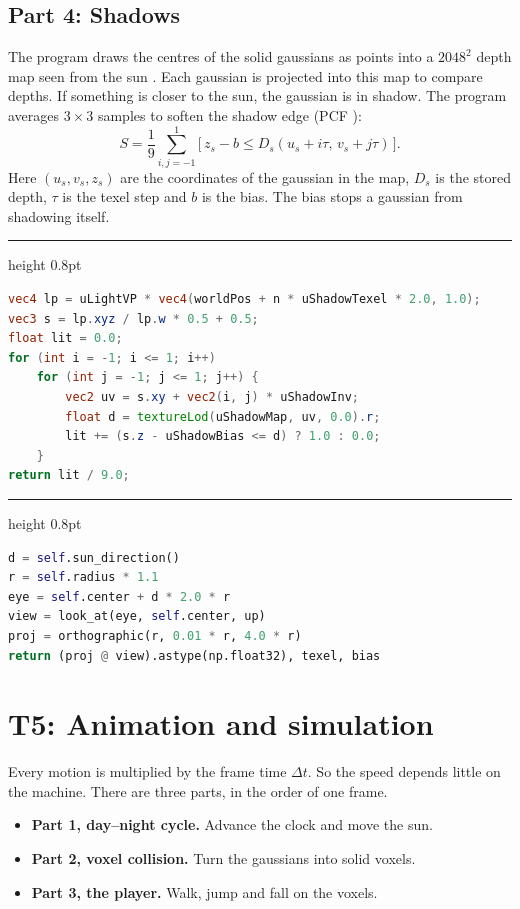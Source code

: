 \documentclass[9pt,twocolumn,a4paper]{extarticle}
\newenvironment{codebox}{\par\vspace{5pt}\noindent\begin{minipage}{\columnwidth}\hrule height 0.8pt\vspace{2pt}}{\end{minipage}\par\vspace{5pt}\noindent\ignorespaces}
\newcommand{\code}[1]{\texttt{#1}}
\begin{document}
\subsection{Part 4: Shadows}
The program draws the centres of the solid gaussians as points into a $2048^2$ depth map seen from the sun \cite{williams1978}. Each gaussian is projected into this map to compare depths. If something is closer to the sun, the gaussian is in shadow. The program averages $3\times3$ samples to soften the shadow edge (PCF \cite{reeves1987}):
\begin{equation}
S=\frac19\sum_{i,j=-1}^{1}\big[\,z_s-b\le D_s(u_s+i\tau,\,v_s+j\tau)\,\big].
\label{eq:pcf}
\end{equation}
Here $(u_s,v_s,z_s)$ are the coordinates of the gaussian in the map, $D_s$ is the stored depth, $\tau$ is the texel step and $b$ is the bias. The bias stops a gaussian from shadowing itself.

\begin{codebox}
\begin{lstlisting}[language=GLSL,caption={\code{render/shaders/splat\_prep.vert}, \code{shadowFactor}: $3\times3$ PCF},label={lst:pcf}]
vec4 lp = uLightVP * vec4(worldPos + n * uShadowTexel * 2.0, 1.0);
vec3 s = lp.xyz / lp.w * 0.5 + 0.5;
float lit = 0.0;
for (int i = -1; i <= 1; i++)
    for (int j = -1; j <= 1; j++) {
        vec2 uv = s.xy + vec2(i, j) * uShadowInv;
        float d = textureLod(uShadowMap, uv, 0.0).r;
        lit += (s.z - uShadowBias <= d) ? 1.0 : 0.0;
    }
return lit / 9.0;
\end{lstlisting}
\end{codebox}

\begin{codebox}
\begin{lstlisting}[language=Python,caption={\code{core/lighting.py}, \code{Lighting.shadow\_setup}: view matrix from the sun},label={lst:shadowsetup}]
d = self.sun_direction()
r = self.radius * 1.1
eye = self.center + d * 2.0 * r
view = look_at(eye, self.center, up)
proj = orthographic(r, 0.01 * r, 4.0 * r)
return (proj @ view).astype(np.float32), texel, bias
\end{lstlisting}
\end{codebox}

\section{T5: Animation and simulation}
\label{chap:t5}
Every motion is multiplied by the frame time $\Delta t$. So the speed depends little on the machine. There are three parts, in the order of one frame.
\begin{itemize}\itemsep0pt
\item \textbf{Part 1, day--night cycle.} Advance the clock and move the sun.
\item \textbf{Part 2, voxel collision.} Turn the gaussians into solid voxels.
\item \textbf{Part 3, the player.} Walk, jump and fall on the voxels.
\end{itemize}
\end{document}
